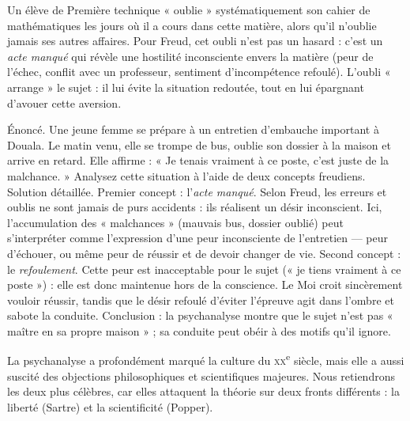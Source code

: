 \documentclass[11pt]{article}
\newcounter{popsec}
\newcounter{popsub}
\newcommand{\courssub}[1]{%
  \stepcounter{popsub}%
  \par\vspace{9pt}\noindent{\popxbold\fontsize{11.5}{13}\selectfont\color{popink}{\color{poporange}\thepopsec.\thepopsub}\hspace{6pt}#1}\par\nopagebreak\vspace{4pt}
}
\begin{document}
\begin{exemplebox}
Un élève de Première technique « oublie » systématiquement son cahier de mathématiques les jours où il a cours dans cette matière, alors qu'il n'oublie jamais ses autres affaires. Pour Freud, cet oubli n'est pas un hasard : c'est un \emph{acte manqué} qui révèle une hostilité inconsciente envers la matière (peur de l'échec, conflit avec un professeur, sentiment d'incompétence refoulé). L'oubli « arrange » le sujet : il lui évite la situation redoutée, tout en lui épargnant d'avouer cette aversion.
\end{exemplebox}

\begin{exoresolu}
Énoncé. Une jeune femme se prépare à un entretien d'embauche important à Douala. Le matin venu, elle se trompe de bus, oublie son dossier à la maison et arrive en retard. Elle affirme : « Je tenais vraiment à ce poste, c'est juste de la malchance. » Analysez cette situation à l'aide de deux concepts freudiens.
\tcblower
Solution détaillée.
Premier concept : l'\emph{acte manqué}. Selon Freud, les erreurs et oublis ne sont jamais de purs accidents : ils réalisent un désir inconscient. Ici, l'accumulation des « malchances » (mauvais bus, dossier oublié) peut s'interpréter comme l'expression d'une peur inconsciente de l'entretien — peur d'échouer, ou même peur de réussir et de devoir changer de vie.
Second concept : le \emph{refoulement}. Cette peur est inacceptable pour le sujet (« je tiens vraiment à ce poste ») : elle est donc maintenue hors de la conscience. Le Moi croit sincèrement vouloir réussir, tandis que le désir refoulé d'éviter l'épreuve agit dans l'ombre et sabote la conduite.
Conclusion : la psychanalyse montre que le sujet n'est pas « maître en sa propre maison » ; sa conduite peut obéir à des motifs qu'il ignore.
\end{exoresolu}

\courssub{Les critiques : Sartre et Popper}

La psychanalyse a profondément marqué la culture du \textsc{xx}\textsuperscript{e} siècle, mais elle a aussi suscité des objections philosophiques et scientifiques majeures. Nous retiendrons les deux plus célèbres, car elles attaquent la théorie sur deux fronts différents : la liberté (Sartre) et la scientificité (Popper).
\end{document}
